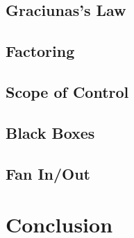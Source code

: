 \documentclass{article}
\begin{document}
	\subsection{Graciunas's Law}
	\subsection{Factoring}
	\subsection{Scope of Control}
	\subsection{Black Boxes}
	\subsection{Fan In/Out}
\section{Conclusion}	
\end{document}

